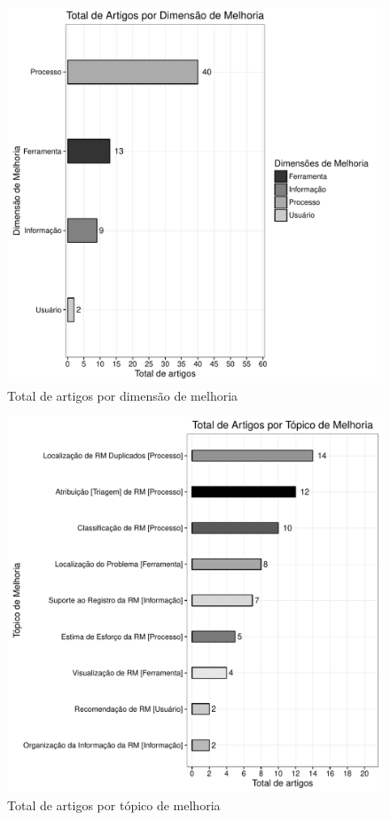 \begin{figure}[htpb]
	\centering
	\includegraphics[width=0.9\linewidth]{./chapter-mapeamento-sistematico/img/grafico_dim_melhoria_por_artigo.pdf}
	\caption{Total de artigos por dimensão de melhoria}
\label{fig:grafico_dim_melhoria_por_artigo}
\end{figure}

\begin{figure}[htpb]
	\centering
	\includegraphics[width=0.8\linewidth]{./chapter-mapeamento-sistematico/img/grafico_topico_por_artigo.pdf}
	\caption{Total de artigos por tópico de melhoria}
\label{fig:grafico_topico_por_artigo}
\end{figure}

